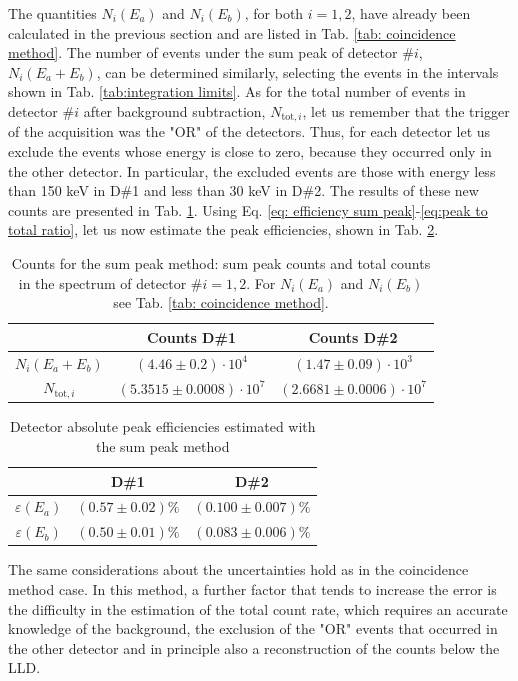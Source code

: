 \documentclass[a4paper]{article}
\begin{document}
The quantities $N_i(E_a)$ and $N_i(E_b)$, for both $i=1,2$, have already been calculated in the previous section and are listed in Tab. \ref{tab: coincidence method}. The number of events under the sum peak of detector $\#i$, $N_i(E_a\!+\!E_b)$, can be determined similarly, selecting the events in the intervals shown in Tab. \ref{tab:integration limits}. 
As for the total number of events in detector $\#i$ after background subtraction, $N_{\mathrm{tot},i}$, let us remember that the trigger of the acquisition was the "OR" of the detectors. Thus, for each detector let us exclude the events whose energy is close to zero, because they occurred only in the other detector. In particular, the excluded events are those with energy less than 150 keV in D\#1 and less than 30 keV in D\#2. 
The results of these new counts are presented in Tab. \ref{tab:sum peak method}. Using Eq. \eqref{eq: efficiency sum peak}-\eqref{eq:peak to total ratio}, let us now estimate the peak efficiencies, shown in Tab. \ref{tab:sum_results}.
\begin{table}[H]
    \centering
    \begin{tabular}{|c|cc|}
    \hline
       &Counts D\#1 &Counts D\#2\\
       \hline
       $N_i(E_a\!+\!E_b)$ & $(4.46\pm0.2)\cdot10^4$ &$(1.47\pm0.09)\cdot10^3$ \\
        $N_{\mathrm{tot},i}$& $(5.3515\pm0.0008)\cdot 10^7$&$(2.6681\pm0.0006)\cdot 10^7$\\
       \hline
    \end{tabular}
    \caption{Counts for the sum peak method: sum peak counts and total counts in the spectrum of detector $\#i=1,2$. For $N_i(E_a)$ and $N_i(E_b)$ see Tab. \ref{tab: coincidence method}.}
    \label{tab:sum peak method}
\end{table}

\begin{table}[H]
    \centering
    \begin{tabular}{|c|cc|}
         \hline
         & D\#1&D\#2\\
         \hline
          $\varepsilon(E_a)$&$(0.57\pm0.02)\%$ & $(0.100\pm0.007)\%$ \\
          $\varepsilon(E_b)$&$(0.50\pm0.01)\%$ & $(0.083\pm0.006)\%$ \\
          \hline
    \end{tabular}
    \caption{Detector absolute peak efficiencies estimated with the sum peak method}
    \label{tab:sum_results}
\end{table}
The same considerations about the uncertainties hold as in the coincidence method case. In this method, a further factor that tends to increase the error is the difficulty in the estimation of the total count rate, which requires an accurate knowledge of the background, the exclusion of the "OR" events that occurred in the other detector and in principle also a reconstruction of the counts below the LLD.
\end{document}
